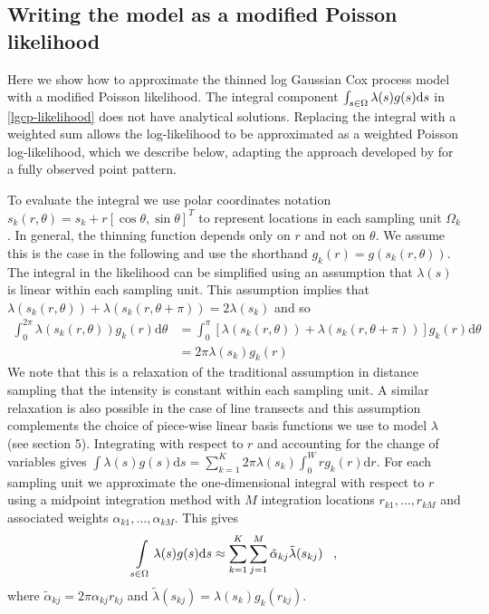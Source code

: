 \documentclass{stylefile16/statsoc}
\newcommand{\tl}{\tilde{\lambda}}   %
\begin{document}
\subsection{Writing the model as a modified Poisson likelihood}

\sloppy Here we show how to approximate the thinned log Gaussian Cox process model with a modified Poisson likelihood.  The integral component $\int\displaylimits_{s \in \Omega} \lambda(s) g(s) \mathrm{d}s$ in \autoref{lgcp-likelihood} does not have analytical solutions.  Replacing the integral with a weighted sum allows the log-likelihood to be approximated as a weighted Poisson log-likelihood, which we describe below, adapting the approach developed by \cite{simpson_going_2016} for a fully observed point pattern.

To evaluate the integral we use polar coordinates notation $s_k(r, \theta) = s_k + r\left[\cos\theta, \sin\theta \right]^T$ to represent locations in each sampling unit $\Omega_k$.   In general, the thinning function depends only on $r$ and not on $\theta$.  We assume this is the case in the following and use the shorthand $g_k(r) = g(s_k(r, \theta))$. The integral in the likelihood can be simplified using an assumption that $\lambda(s)$ is linear within each sampling unit.  This assumption implies that $\lambda(s_k(r, \theta)) + \lambda(s_k(r, \theta + \pi)) = 2\lambda(s_k)$ and so
\begin{align*}
	\int_0^{2\pi} \lambda(s_k(r, \theta))g_k(r)\mathrm{d}\theta &= \int_0^\pi \left[\lambda(s_k(r, \theta)) + \lambda(s_k(r, \theta + \pi)) \right] g_k(r)\mathrm{d}\theta \\
	&= 2\pi \lambda(s_k)g_k(r)
\end{align*}
We note that this is a relaxation of the traditional assumption in distance sampling that the intensity is constant within each sampling unit.  A similar relaxation is also possible in the case of line transects \citep{yuan_point_2017} and this assumption complements the choice of piece-wise linear basis functions we use to model $\lambda$ (see section 5).  Integrating with respect to $r$ and accounting for the change of variables gives $\int \lambda(s)g(s) \mathrm{d}s = \sum_{k=1}^K 2\pi \lambda(s_k) \int_0^W r g_k(r)\mathrm{d}r$.   For each sampling unit we approximate the one-dimensional integral with respect to $r$ using a midpoint integration method with $M$ integration locations $r_{k1}, \ldots, r_{kM}$ and associated weights $\alpha_{k1}, \ldots, \alpha_{kM}$.  This gives
\begin{equation*}
	\int\displaylimits_{s \in \Omega} \lambda(s)g(s)\mathrm{d}s \approx \sum_{k=1}^K \sum_{j=1}^M \tilde{\alpha}_{kj} \tl(s_{kj}) \;\;\; ,
\end{equation*}
where $\tilde{\alpha}_{kj} = 2\pi \alpha_{kj}r_{kj}$ and $\tl(s_{kj}) = \lambda(s_k) g_k(r_{kj})$.
\end{document}
